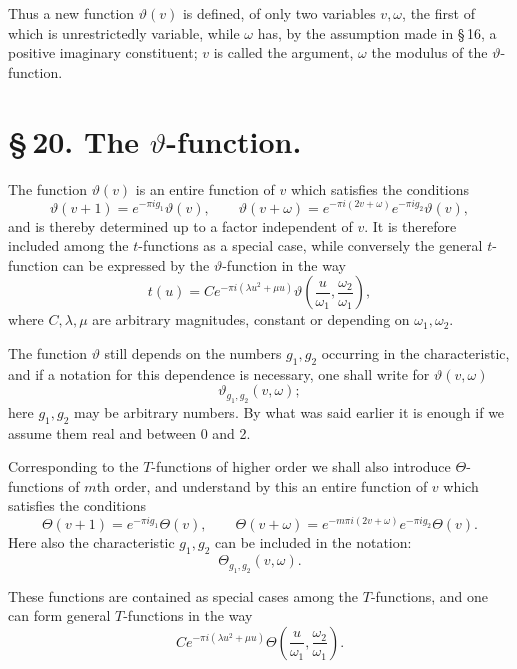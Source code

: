 \documentclass[11pt]{article}
\begin{document}
Thus a new function $\vartheta(v)$ is defined, of only two variables $v,\omega$, the first of which is unrestrictedly variable, while $\omega$ has, by the assumption made in \S\,16, a positive imaginary constituent; $v$ is called the argument, $\omega$ the modulus of the $\vartheta$-function.

\section*{\S\,20. The $\vartheta$-function.}

The function $\vartheta(v)$ is an entire function of $v$ which satisfies the conditions
\begin{equation}
\vartheta(v+1)=e^{-\pi i g_1}\vartheta(v),\qquad
\vartheta(v+\omega)=e^{-\pi i(2v+\omega)}e^{-\pi i g_2}\vartheta(v),
\tag{1}
\end{equation}
and is thereby determined up to a factor independent of $v$. It is therefore included among the $t$-functions as a special case, while conversely the general $t$-function can be expressed by the $\vartheta$-function in the way
\[
t(u)=Ce^{-\pi i(\lambda u^2+\mu u)}
\vartheta\!\left(\frac{u}{\omega_1},\frac{\omega_2}{\omega_1}\right),
\]
where $C,\lambda,\mu$ are arbitrary magnitudes, constant or depending on $\omega_1,\omega_2$.

The function $\vartheta$ still depends on the numbers $g_1,g_2$ occurring in the characteristic, and if a notation for this dependence is necessary, one shall write for $\vartheta(v,\omega)$
\[
\vartheta_{g_1,g_2}(v,\omega);
\]
here $g_1,g_2$ may be arbitrary numbers. By what was said earlier it is enough if we assume them real and between 0 and 2.

Corresponding to the $T$-functions of higher order we shall also introduce $\Theta$-functions of $m$th order, and understand by this an entire function of $v$ which satisfies the conditions
\begin{equation}
\Theta(v+1)=e^{-\pi i g_1}\Theta(v),\qquad
\Theta(v+\omega)=e^{-m\pi i(2v+\omega)}e^{-\pi i g_2}\Theta(v).
\tag{2}
\end{equation}
Here also the characteristic $g_1,g_2$ can be included in the notation:
\[
\Theta_{g_1,g_2}(v,\omega).
\]

These functions are contained as special cases among the $T$-functions, and one can form general $T$-functions in the way
\begin{equation}
Ce^{-\pi i(\lambda u^2+\mu u)}
\Theta\!\left(\frac{u}{\omega_1},\frac{\omega_2}{\omega_1}\right).
\tag{3}
\end{equation}
\end{document}
